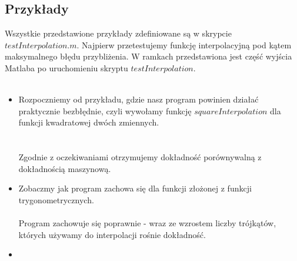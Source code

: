 \documentclass{article}
\begin{document}
\subsection{Przykłady}
Wszystkie przedstawione przykłady zdefiniowane są w skrypcie $testInterpolation.m$. Najpierw przetestujemy funkcję interpolacyjną pod kątem maksymalnego błędu przybliżenia. W ramkach przedstawiona jest część wyjścia Matlaba po uruchomieniu skryptu $testInterpolation$.\\\\
\begin{itemize}
\item
Rozpoczniemy od przykładu, gdzie nasz program powinien działać praktycznie bezbłędnie, czyli wywołamy funkcję $squareInterpolation$ dla funkcji kwadratowej dwóch zmiennych.\\
\noindent{}\\\\
Zgodnie z oczekiwaniami otrzymujemy dokładność porównywalną z dokładnością maszynową.
\item
Zobaczmy jak program zachowa się dla funkcji złożonej z funkcji trygonometrycznych.
\noindent{}\\\\
Program zachowuje się poprawnie - wraz ze wzrostem liczby trójkątów, których używamy do interpolacji rośnie dokładność.
\item

\noindent{}
\end{itemize}
\end{document}
